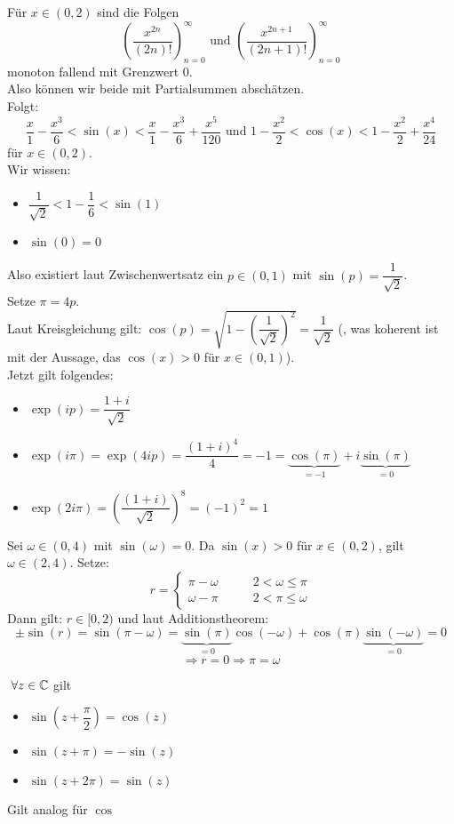\documentclass[main.tex]{subfiles}
\begin{document}
\begin{Beweis}
  Für $x ∈ (0,2)$ sind die Folgen
  $$\left(\dfrac{x^{2n}}{(2n)!}\right)_{n=0}^\infty \text{ und } \left(\dfrac{x^{2n+1}}{(2n+1)!}\right)_{n=0}^\infty$$
  monoton fallend mit Grenzwert $0$.\\
  Also können wir beide mit Partialsummen abschätzen.\\
  Folgt:
  $$\dfrac{x}{1} -\dfrac{x^3}{6} < \sin(x) < \dfrac{x}{1} - \dfrac{x^3}{6} + \dfrac{x^5}{120} \text{ und } 1 - \dfrac{x^2}{2} < \cos(x) < 1 -\dfrac{x^2}{2} + \dfrac{x^4}{24}$$
  für $x \in (0,2)$.\\
  Wir wissen:
  \begin{itemize}
    \item $\dfrac{1}{\sqrt{2}} < 1 - \dfrac{1}{6} < \sin(1)$
    \item $\sin(0) = 0$
  \end{itemize}
  Also existiert laut Zwischenwertsatz ein $p \in (0,1)$ mit $\sin(p) = \dfrac{1}{\sqrt{2}}$.\\
  Setze $\pi = 4p$.\\
  Laut Kreisgleichung gilt: $\cos(p) = \sqrt{1 - \left(\dfrac{1}{\sqrt{2}}\right)^2} = \dfrac{1}{\sqrt{2}}$ (, was koherent ist mit der Aussage, das $\cos(x) > 0$ für $x \in (0,1)$).\\
  Jetzt gilt folgendes:
  \begin{itemize}
    \item $\exp(i p) = \dfrac{1+i}{\sqrt{2}}$
    \item $\exp(i \pi) = \exp(4 i p) = \dfrac{(1+i)^4}{4} = -1 = \underbrace{\cos(\pi)}_{=-1} + i \underbrace{\sin(\pi)}_{=0}$
    \item $\exp(2 i \pi) = \left(\dfrac{(1+i)}{\sqrt{2}}\right)^8 = (-1)^2  = 1$
  \end{itemize}
  Sei $\omega \in (0,4)$ mit $\sin(\omega) = 0$. Da $\sin(x) > 0$ für $x \in (0,2)$, gilt $\omega \in (2,4)$. Setze:
  $$r = \left\{ \begin{aligned}
    \pi - \omega \qquad & 2 < \omega \leq \pi \\
    \omega -\pi & 2 < \pi \leq \omega
  \end{aligned}\right.$$
  Dann gilt: $r \in [0,2)$ und laut Additionstheorem:
  $$\pm \sin(r) = \sin(\pi - \omega) = \underbrace{\sin(\pi)}_{=0} \cos(-\omega) + \cos(\pi) \underbrace{\sin(-\omega)}_{=0} = 0$$
  $$\Rightarrow r = 0 \Rightarrow \pi = \omega$$
\end{Beweis}

\begin{Korollar}
  $\;\forall z \in \mathbb{C}$ gilt
  \begin{itemize}
    \item $\sin\left(z + \dfrac{\pi}{2}\right) = \cos(z)$
    \item $\sin(z + \pi) = -\sin(z)$
    \item $\sin(z + 2\pi) = \sin(z)$
  \end{itemize}
  Gilt analog für $\cos$
\end{Korollar}
\end{document}
